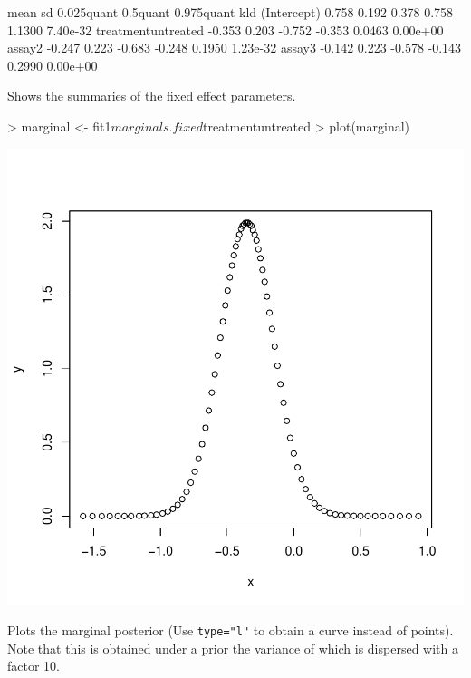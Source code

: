 \documentclass[11pt]{article}
\begin{document}
\begin{Schunk}
\begin{Soutput}
                     mean    sd 0.025quant 0.5quant 0.975quant      kld
(Intercept)         0.758 0.192      0.378    0.758     1.1300 7.40e-32
treatmentuntreated -0.353 0.203     -0.752   -0.353     0.0463 0.00e+00
assay2             -0.247 0.223     -0.683   -0.248     0.1950 1.23e-32
assay3             -0.142 0.223     -0.578   -0.143     0.2990 0.00e+00
\end{Soutput}
\end{Schunk}
Shows the summaries of the fixed effect parameters.

\begin{Schunk}
\begin{Sinput}
> marginal <- fit1$marginals.fixed$treatmentuntreated
> plot(marginal)
\end{Sinput}
\end{Schunk}
\includegraphics{ShrinkBayes-045}

\noindent
Plots the marginal posterior (Use {\tt type="l"} to obtain a curve instead of points). Note that this is obtained
under a prior the variance of which is dispersed with a factor 10.
\end{document}
